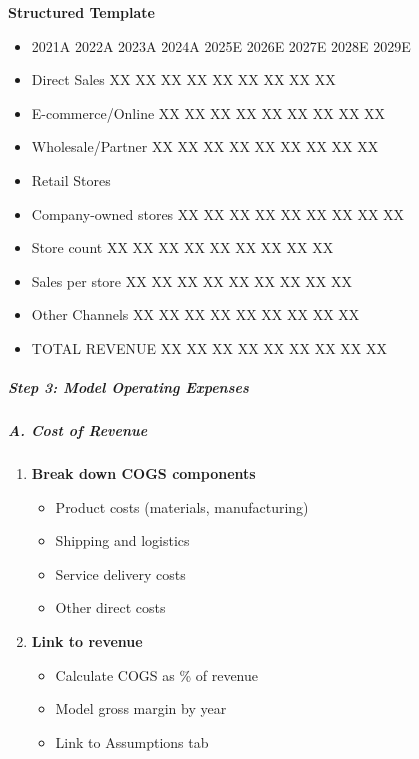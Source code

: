\documentclass[11pt]{article}
\begin{document}
\textbf{Structured Template}
\begin{itemize}[leftmargin=*,itemsep=2pt,topsep=2pt]
\item {} 2021A 2022A 2023A 2024A 2025E 2026E 2027E 2028E 2029E
\item {} Direct Sales XX XX XX XX XX XX XX XX XX
\item {} E-commerce/Online XX XX XX XX XX XX XX XX XX
\item {} Wholesale/Partner XX XX XX XX XX XX XX XX XX
\item {} Retail Stores
\item {} Company-owned stores XX XX XX XX XX XX XX XX XX
\item {} Store count XX XX XX XX XX XX XX XX XX
\item {} Sales per store XX XX XX XX XX XX XX XX XX
\item {} Other Channels XX XX XX XX XX XX XX XX XX
\item {} TOTAL REVENUE XX XX XX XX XX XX XX XX XX
\end{itemize}

\subparagraph{Step 3: Model Operating Expenses}\mbox{}\par

\subparagraph{A. Cost of Revenue}\mbox{}\par
\begin{enumerate}[leftmargin=*,itemsep=2pt,topsep=2pt]
\item {} \textbf{Break down COGS components}
\begin{itemize}[leftmargin=*,itemsep=2pt,topsep=2pt]
\item {} Product costs (materials, manufacturing)
\item {} Shipping and logistics
\item {} Service delivery costs
\item {} Other direct costs
\end{itemize}
\item {} \textbf{Link to revenue}
\begin{itemize}[leftmargin=*,itemsep=2pt,topsep=2pt]
\item {} Calculate COGS as \% of revenue
\item {} Model gross margin by year
\item {} Link to Assumptions tab
\end{itemize}
\end{enumerate}
\end{document}
